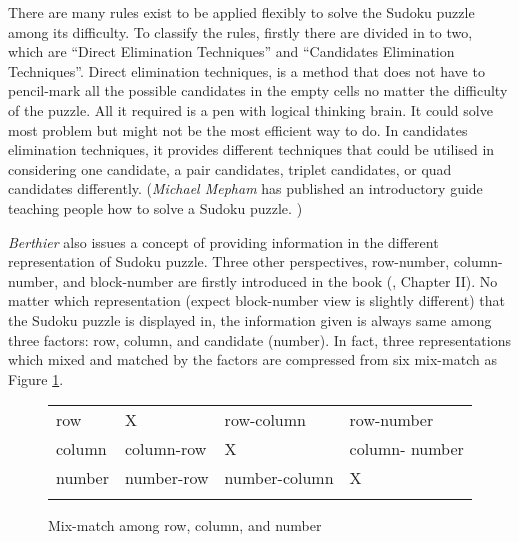 \documentclass[11pt]{report}
\begin{document}
There are many rules exist to be applied flexibly to solve the Sudoku puzzle among its difficulty. To classify the rules, firstly there are divided in to two, which are ``Direct Elimination Techniques'' and ``Candidates Elimination Techniques''. Direct elimination techniques, is a method that does not have to pencil-mark all the possible candidates in the empty cells no matter the difficulty of the puzzle. All it required is a pen with logical thinking brain. It could solve most problem but might not be the most efficient way to do. In candidates elimination techniques, it provides different techniques that could be utilised in considering one candidate, a pair candidates, triplet candidates, or quad candidates differently. (\emph{Michael Mepham} has published an introductory guide teaching people how to solve a Sudoku puzzle. \cite{Mepham2005Solving})

\emph{Berthier} also issues a concept of providing information in the different representation of Sudoku puzzle. Three other perspectives, row-number, column-number, and block-number are firstly introduced in the book (\cite{Berthier2007Sudoku}, Chapter II). No matter which representation (expect block-number view is slightly different) that the Sudoku puzzle is displayed in, the information given is always same among three factors: row, column, and candidate (number). In fact, three representations which mixed and matched by the factors are compressed from six mix-match as Figure \ref{fig:mixmatch}.

\begin{figure}[htbp]
\setlength{\tabcolsep}{3pt}
\renewcommand{\arraystretch}{2}
\begin{center}
\begin{tabular}{ >{\centering\arraybackslash}m{0.6in}|| >{\centering\arraybackslash}m{1.2in}|| >{\centering\arraybackslash}m{1.2in}|| >{\centering\arraybackslash}m{1.2in}||}
\multicolumn{1}{c}{} & \multicolumn{1}{c}{row} & \multicolumn{1}{c}{column} & \multicolumn{1}{c}{number}\\ \cline{2-4}
row & X & row-column & row-number\\ \cline{2-4}
column & column-row \cellcolor[gray]{.8}& X& column- number\\ \cline{2-4}
number & number-row \cellcolor[gray]{.8}& number-column \cellcolor[gray]{.8}& X\\ \cline{2-4}
\end{tabular}
\end{center}
\caption{Mix-match among row, column, and number}
\label{fig:mixmatch}
\end{figure}
\end{document}
